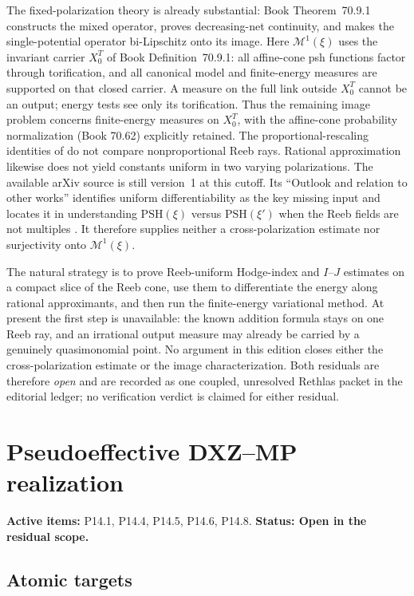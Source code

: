 \documentclass[11pt,a4paper]{article}
\theoremstyle{definition}
\theoremstyle{remark}
\newcommand{\PSH}{\mathrm{PSH}}
\begin{document}
The fixed-polarization theory is already substantial:
Book Theorem~70.9.1 constructs the mixed operator,
proves decreasing-net continuity, and makes the single-potential operator
bi-Lipschitz onto its image.  Here \(\mathcal M^1(\xi)\) uses the invariant
carrier \(X_0^T\) of Book Definition~70.9.1: all affine-cone psh
functions factor through torification, and all canonical model and
finite-energy measures are supported on that closed carrier.  A measure
on the full link outside \(X_0^T\) cannot be an output; energy tests see
only its torification.  Thus the remaining image problem concerns
finite-energy measures on \(X_0^T\), with the affine-cone probability
normalization \textup{(Book 70.62)} explicitly retained.
The proportional-rescaling identities of
\cite[Proposition~3.3]{Wu24AffineCones} do not compare nonproportional Reeb
rays.  Rational approximation likewise does not yield constants uniform in
two varying polarizations.  The available arXiv source is still
version~1 at this cutoff.  Its ``Outlook and relation to other works''
identifies uniform differentiability as the key missing input and locates
it in understanding \(\PSH(\xi)\) versus \(\PSH(\xi')\) when the Reeb
fields are not multiples \cite{Wu24AffineCones}.  It therefore supplies
neither a cross-polarization estimate nor surjectivity onto
\(\mathcal M^1(\xi)\).

The natural strategy is to prove Reeb-uniform Hodge-index and
\(I\)--\(J\) estimates on a compact slice of the Reeb cone, use them to
differentiate the energy along rational approximants, and then run the
finite-energy variational method.  At present the first step is unavailable:
the known addition formula stays on one Reeb ray, and an irrational output
measure may already be carried by a genuinely quasimonomial point.  No
argument in this edition closes either the cross-polarization estimate or the
image characterization.  Both residuals are therefore \emph{open} and are
recorded as one coupled, unresolved Rethlas packet in the editorial ledger;
no verification verdict is claimed for either residual.

\clearpage\section{Pseudoeffective DXZ--MP realization}
\label{family:8}
\noindent\textbf{Active items:} P14.1, P14.4, P14.5, P14.6, P14.8. \textbf{Status: Open in the residual scope.}

\subsection{Atomic targets}
\end{document}
